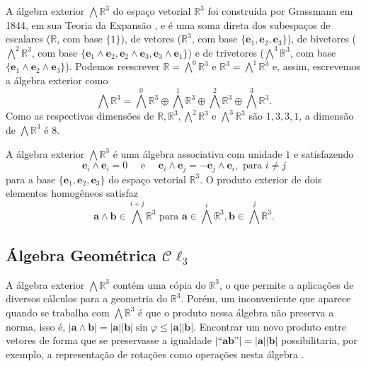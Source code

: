 \documentclass[a4paper,12pt]{report}
\theoremstyle{plain}
\theoremstyle{definition}
\newcommand{\norm}[1]{\left| #1 \right|}
\begin{document}
	A álgebra exterior $\bigwedge\mathbb{R}^3$ do espaço vetorial $\mathbb{R}^3$ foi construída por Grassmann em 1844, em sua Teoria da Expansão \cite{grassmannLineale}, e é uma soma direta dos subespaços de escalares ($\mathbb{R}$, com base $\{1\}$), de vetores ($\mathbb{R}^3$, com base $\{\mathbf e_1,\mathbf e_2,\mathbf e_3\}$), de bivetores ($\bigwedge^2\mathbb{R}^3$, com base $\{\mathbf e_1\wedge\mathbf e_2, \mathbf e_2\wedge\mathbf e_3, \mathbf e_3\wedge\mathbf e_1\}$) e de trivetores ($\bigwedge^3\mathbb{R}^3$, com base $\{\mathbf e_1\wedge\mathbf e_2\wedge\mathbf e_3\}$). Podemos reescrever $\mathbb{R} = \bigwedge^0\mathbb{R}^3$ e $\mathbb{R}^3 = \bigwedge^1\mathbb{R}^3$ e, assim, escrevemos a álgebra exterior como $$\bigwedge\mathbb{R}^3 = \bigwedge^0\mathbb{R}^3 \oplus \bigwedge^1\mathbb{R}^3\oplus \bigwedge^2\mathbb{R}^3 \oplus \bigwedge^3\mathbb{R}^3.$$
	Como as respectivas dimensões de $\mathbb{R}, \mathbb{R}^3, \bigwedge^2\mathbb{R}^3$ e $\bigwedge^3\mathbb{R}^3$ são $1,3,3,1$, a dimensão de $\bigwedge\mathbb{R}^3$ é 8.
	 
	A álgebra exterior $\bigwedge\mathbb{R}^3$ é uma álgebra associativa com unidade $1$ e satisfazendo $$\mathbf e_i\wedge\mathbf e_i = 0\quad \text{ e } \quad\mathbf e_i\wedge\mathbf e_j = -\mathbf e_j \wedge\mathbf e_i, \text{ para } i\neq j$$ para a base $\{\mathbf e_1,\mathbf e_2,\mathbf e_3\}$ do espaço vetorial $\mathbb{R}^3$. O produto exterior de dois elementos homogêneos satisfaz
	$$\mathbf a\wedge\mathbf b\in \bigwedge^{i+j}\mathbb{R}^3\text{ para } \mathbf a\in \bigwedge^i\mathbb{R}^3, \mathbf b\in \bigwedge^j\mathbb{R}^3.$$	
	
	\subsection{Álgebra Geométrica $\mathcal C \ell_3$}
	A álgebra exterior $\bigwedge\mathbb{R}^3$ contém uma cópia do $\mathbb{R}^3$, o que permite a aplicações de diversos cálculos para a geometria do $\mathbb{R}^3$. Porém, um inconveniente que aparece quando se trabalha com $\bigwedge\mathbb{R}^3$ é que o produto nessa álgebra não preserva a norma, isso é, $\norm{\mathbf a\wedge\mathbf b} = \norm{\mathbf a}\norm{\mathbf b}\sin\varphi \leq \norm{\mathbf a}\norm{\mathbf b}$. Encontrar um novo produto entre vetores de forma que se preservasse a igualdade $\norm{\text{``}\mathbf a\mathbf b\text{''}} = \norm{\mathbf a}\norm{\mathbf b}$ possibilitaria, por exemplo, a representação de rotações como operações nesta álgebra \cite{lounestoClifford}. 
	
\end{document}
